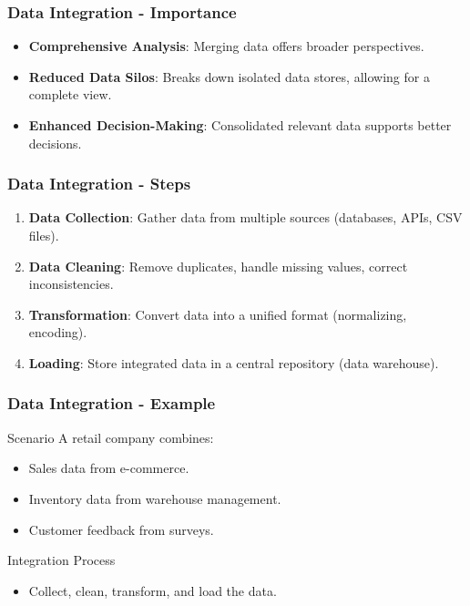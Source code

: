 \documentclass[aspectratio=169]{beamer}
\begin{document}
\begin{frame}[fragile]
    \frametitle{Data Integration - Importance}
    \begin{itemize}
        \item \textbf{Comprehensive Analysis}: Merging data offers broader perspectives.
        \item \textbf{Reduced Data Silos}: Breaks down isolated data stores, allowing for a complete view.
        \item \textbf{Enhanced Decision-Making}: Consolidated relevant data supports better decisions.
    \end{itemize}
\end{frame}

\begin{frame}[fragile]
    \frametitle{Data Integration - Steps}
    \begin{enumerate}
        \item \textbf{Data Collection}: Gather data from multiple sources (databases, APIs, CSV files).
        \item \textbf{Data Cleaning}: Remove duplicates, handle missing values, correct inconsistencies.
        \item \textbf{Transformation}: Convert data into a unified format (normalizing, encoding).
        \item \textbf{Loading}: Store integrated data in a central repository (data warehouse).
    \end{enumerate}
\end{frame}

\begin{frame}[fragile]
    \frametitle{Data Integration - Example}
    \begin{block}{Scenario}
        A retail company combines:
        \begin{itemize}
            \item Sales data from e-commerce.
            \item Inventory data from warehouse management.
            \item Customer feedback from surveys.
        \end{itemize}
    \end{block}
    \begin{block}{Integration Process}
        \begin{itemize}
            \item Collect, clean, transform, and load the data.
        \end{itemize}
    \end{block}
\end{frame}
\end{document}
